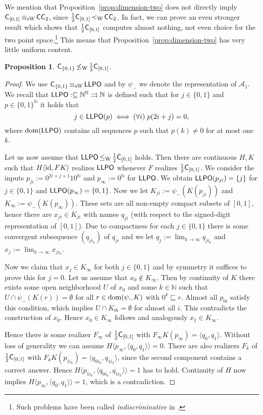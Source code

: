 \documentclass[a4paper]{amsart}
\def\AA{{\mathcal A}}
\def\IN{{\mathbb{N}}}
\def\In{\subseteq}
\def\prefix{\sqsubseteq}
\def\mto{\rightrightarrows}
\def\id{{\rm id}}
\def\dom{{\rm dom}}
\def\LLPO{\text{\rm\sffamily LLPO}}
\def\C{\mbox{\rm\sffamily C}}
\def\ConC{\mbox{\rm\sffamily CC}}
\def\LLPO{\mbox{\rm\sffamily LLPO}}
\def\leqW{\mathop{\leq_{\mathrm{W}}}}
\def\equivSW{\mathop{\equiv_{\mathrm{sW}}}}
\def\nleqW{\mathop{\not\leq_{\mathrm{W}}}}
\def\lW{\mathop{<_{\mathrm{W}}}}
\newtheorem{proposition}[theorem]{Proposition}
\theoremstyle{definition}
\begin{document}
We mention that Proposition~\ref{prop:dimension-two} does not directly imply $\C_{[0,1]}\equivSW\ConC_2$,
since $\frac{1}{2}\C_{[0,1]}\lW\ConC_2$. In fact, we can prove an even stronger result which shows
that $\frac{1}{2}\C_{[0,1]}$ computes almost nothing, not even choice for the two point space.\footnote{Such problems 
have been called {\em indiscriminative} in \cite{BHK17a}.}
This means that Proposition~\ref{prop:dimension-two} has very little uniform content.

\begin{proposition}
\label{prop:half-choice}
$\C_{\{0,1\}}\nleqW\frac{1}{2}\C_{[0,1]}$.
\end{proposition}
\begin{proof}
We use $\C_{\{0,1\}}\equivSW\LLPO$ and 
by $\psi_-$ we denote the representation of $\AA_1$. 
We recall that $\LLPO:\In\IN^\IN\mto\IN$ is defined such that for $j\in\{0,1\}$ and $p\in\{0,1\}^\IN$ it holds that
\[j\in\LLPO(p)\iff(\forall i)\;p(2i+j)=0,\]
where $\dom(\LLPO)$ contains all sequences $p$ such that $p(k)\not=0$ for at most one $k$.

Let us now assume that $\LLPO\leqW\frac{1}{2}\C_{[0,1]}$ holds.
Then there are continuous $H,K$ such that $H\langle\id,FK\rangle$ realizes $\LLPO$
whenever $F$ realizes $\frac{1}{2}\C_{[0,1]}$.
We consider the inputs $p_{ji}:=0^{2i+j+1}10^\IN$ and $p_\infty:=0^\IN$ for $\LLPO$.
We obtain $\LLPO(p_{ji})=\{j\}$ for $j\in\{0,1\}$ and $\LLPO(p_\infty)=\{0,1\}$.
Now we let $K_{ji}:=\psi_-(K(p_{ji}))$ and $K_\infty:=\psi_-(K(p_\infty))$. These sets
are all non-empty compact subsets of $[0,1]$, hence there are $x_{ji}\in K_{ji}$ with names $q_{ji}$ 
(with respect to the signed-digit representation of $[0,1]$).
Due to compactness for each $j\in\{0,1\}$ there is some convergent subsequence $(q_{ji_k})$ of $q_{ji}$
and we let $q_j:=\lim_{k\to\infty}q_{ji_k}$ and $x_j:=\lim_{k\to\infty}x_{ji_k}$.

Now we claim that $x_j\in K_\infty$ for both $j\in\{0,1\}$ and by symmetry it suffices to prove
this for $j=0$. Let us assume that $x_0\not\in K_\infty$. Then by continuity of $K$ there
exists some open neighborhood $U$ of $x_0$ and some $k\in\IN$ such that
$U\cap\psi_-(K(r))=\emptyset$ for all $r\in\dom(\psi_-K)$ with $0^k\prefix r$.
Almost all $p_{0i}$ satisfy this condition, which implies $U\cap K_{0i}=\emptyset$ for almost all $i$.
This contradicts the construction of $x_0$. Hence $x_0\in K_\infty$ follows and analogously $x_1\in K_\infty$.

Hence there is some realizer $F_\infty$ of $\frac{1}{2}\C_{[0,1]}$ with $F_\infty K(p_\infty)=\langle q_0,q_1\rangle$.
Without loss of generality we can assume $H\langle p_\infty,\langle q_0,q_1\rangle\rangle=0$.
There are also realizers $F_k$ of $\frac{1}{2}\C_{[0,1]}$ with 
$F_kK(p_{1i_k})=\langle q_{0i_k},q_{1i_k}\rangle$, since the second component contains a correct answer.
Hence $H\langle p_{1i_k},\langle q_{0i_k},q_{1i_k}\rangle\rangle=1$ has to hold.
Continuity of $H$ now implies $H\langle p_\infty,\langle q_0,q_1\rangle\rangle=1$,
which is a contradiction.
\end{proof}
\end{document}
